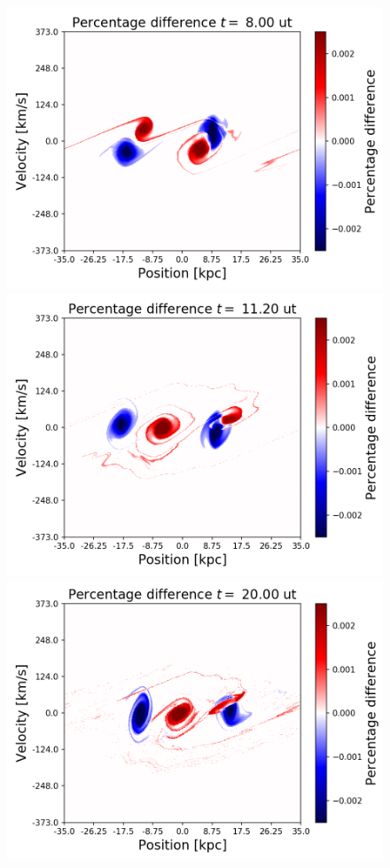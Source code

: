 \begin{figure}[h!]
    \centering
    \includegraphics[scale=0.45]{imag/diffBullet20.png}
    \includegraphics[scale=0.45]{imag/diffBullet28.png}
    \includegraphics[scale=0.45]{imag/diffBullet50.png}

\end{figure}
